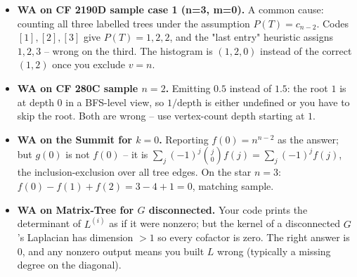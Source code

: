
\begin{itemize}[nosep]
  \item \textbf{WA on CF 2190D sample case 1 (n=3, m=0).}  A common cause:
        counting all three labelled trees under the assumption
        \(P(T)=c_{n-2}\).  Codes \([1],[2],[3]\) give \(P(T)=1,2,2\), and
        the "last entry" heuristic assigns \(1,2,3\) -- wrong on the
        third.  The histogram is \((1,2,0)\) instead of the correct
        \((1,2)\) once you exclude \(v=n\).
  \item \textbf{WA on CF 280C sample \(n=2\).}  Emitting \(0.5\) instead
        of \(1.5\): the root \(1\) is at depth \(0\) in a BFS-level view,
        so \(1/\mathrm{depth}\) is either undefined or you have to skip
        the root.  Both are wrong -- use vertex-count depth starting at
        \(1\).
  \item \textbf{WA on the Summit for \(k=0\).}  Reporting \(f(0)=n^{n-2}\)
        as the answer; but \(g(0)\) is not \(f(0)\) -- it is
        \(\sum_j(-1)^j\binom{j}{0}f(j)=\sum_j(-1)^j f(j)\), the
        inclusion-exclusion over all tree edges.  On the star \(n=3\):
        \(f(0)-f(1)+f(2)=3-4+1=0\), matching sample.
  \item \textbf{WA on Matrix-Tree for \(G\) disconnected.}  Your code
        prints the determinant of \(L^{(i)}\) as if it were nonzero; but
        the kernel of a disconnected \(G\)'s Laplacian has dimension \(>1\)
        so every cofactor is zero.  The right answer is \(0\), and any
        nonzero output means you built \(L\) wrong (typically a missing
        degree on the diagonal).
\end{itemize}


